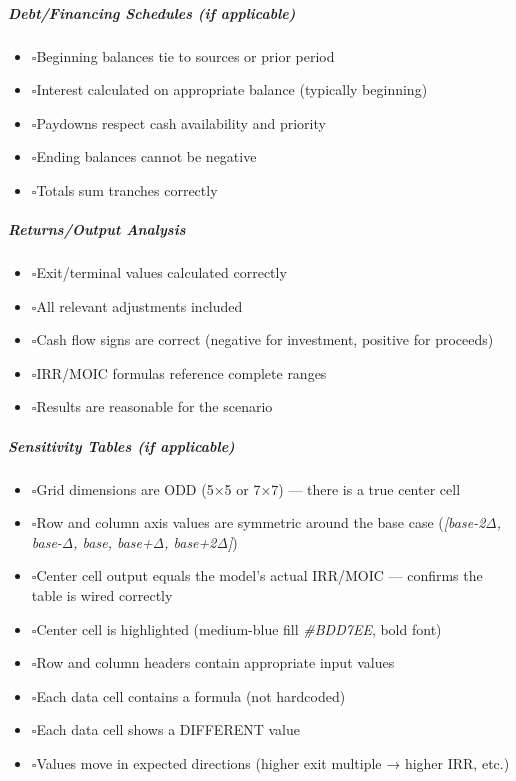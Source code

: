 \documentclass[11pt]{article}
\newcommand{\UncheckedBox}{$\square$}
\begin{document}
\subparagraph{Debt/Financing Schedules (if applicable)}\mbox{}\par
\begin{itemize}[leftmargin=*,itemsep=2pt,topsep=2pt]
\item {} \UncheckedBox Beginning balances tie to sources or prior period
\item {} \UncheckedBox Interest calculated on appropriate balance (typically beginning)
\item {} \UncheckedBox Paydowns respect cash availability and priority
\item {} \UncheckedBox Ending balances cannot be negative
\item {} \UncheckedBox Totals sum tranches correctly
\end{itemize}

\subparagraph{Returns/Output Analysis}\mbox{}\par
\begin{itemize}[leftmargin=*,itemsep=2pt,topsep=2pt]
\item {} \UncheckedBox Exit/terminal values calculated correctly
\item {} \UncheckedBox All relevant adjustments included
\item {} \UncheckedBox Cash flow signs are correct (negative for investment, positive for proceeds)
\item {} \UncheckedBox IRR/MOIC formulas reference complete ranges
\item {} \UncheckedBox Results are reasonable for the scenario
\end{itemize}

\subparagraph{Sensitivity Tables (if applicable)}\mbox{}\par
\begin{itemize}[leftmargin=*,itemsep=2pt,topsep=2pt]
\item {} \UncheckedBox Grid dimensions are ODD (5×5 or 7×7) — there is a true center cell
\item {} \UncheckedBox Row and column axis values are symmetric around the base case (\emph{[base-2Δ, base-Δ, base, base+Δ, base+2Δ]})
\item {} \UncheckedBox Center cell output equals the model's actual IRR/MOIC — confirms the table is wired correctly
\item {} \UncheckedBox Center cell is highlighted (medium-blue fill \emph{\#BDD7EE}, bold font)
\item {} \UncheckedBox Row and column headers contain appropriate input values
\item {} \UncheckedBox Each data cell contains a formula (not hardcoded)
\item {} \UncheckedBox Each data cell shows a DIFFERENT value
\item {} \UncheckedBox Values move in expected directions (higher exit multiple → higher IRR, etc.)
\end{itemize}
\end{document}
